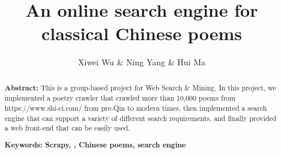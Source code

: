 \documentclass{scrartcl}
\begin{document}
\title{An online search engine for classical Chinese poems}
\author{Xiwei Wu \& Ning Yang \& Hui Ma}

\date{}
\maketitle

\begin{abstract}
  \textbf{Abstract:} This is a group-based project for Web Search \& Mining. In this project, we implemented a poetry crawler that crawled more than 10,000 poems from https://www.shi-ci.com/ from pre-Qin to modern times, then implemented a search engine that can support a variety of different search requirements, and finally provided a web front-end that can be easily used. 

\textbf{Keywords: Scrapy, , Chinese poems, search engine}
\end{abstract}







\end{document}
